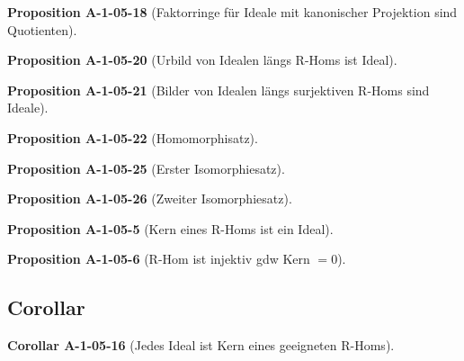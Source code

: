 \documentclass[10pt, letterpaper]{article}
\newcommand{\CustomHeading}[3]{%
  \par\medskip\noindent%
  \textbf{#1 #2} \textnormal{(#3)}.\enskip%
}
\newenvironment{PROP}[2]{\CustomHeading{Proposition}{#1}{#2}}{}
\newenvironment{KORO}[2]{\CustomHeading{Corollar}{#1}{#2}}{}
\begin{document}
\begin{PROP}{A-1-05-18}{Faktorringe für Ideale mit kanonischer Projektion sind Quotienten}

\end{PROP}

\begin{PROP}{A-1-05-20}{Urbild von Idealen längs R-Homs ist Ideal}

\end{PROP}

\begin{PROP}{A-1-05-21}{Bilder von Idealen längs surjektiven R-Homs sind Ideale}

\end{PROP}

\begin{PROP}{A-1-05-22}{Homomorphisatz}

\end{PROP}

\begin{PROP}{A-1-05-25}{Erster Isomorphiesatz}

\end{PROP}

\begin{PROP}{A-1-05-26}{Zweiter Isomorphiesatz}

\end{PROP}

\begin{PROP}{A-1-05-5}{Kern eines R-Homs ist ein Ideal}

\end{PROP}

\begin{PROP}{A-1-05-6}{R-Hom ist injektiv gdw Kern $= 0$}

\end{PROP}



















\subsection{Corollar}



\begin{KORO}{A-1-05-16}{Jedes Ideal ist Kern eines geeigneten R-Homs}

\end{KORO}
\end{document}

